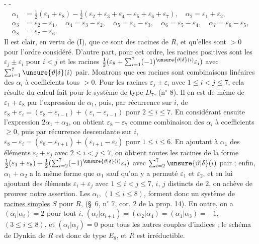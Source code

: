 -  -
\[
\begin{aligned}
\alpha_1&=\tfrac12(\varepsilon_1+\varepsilon_8)-\tfrac12(\varepsilon_2+\varepsilon_3+\varepsilon_4+\varepsilon_5+\varepsilon_6+\varepsilon_7),\quad
\alpha_2=\varepsilon_1+\varepsilon_2,\\
\alpha_3&=\varepsilon_2-\varepsilon_1,\quad
\alpha_4=\varepsilon_3-\varepsilon_2,\quad
\alpha_5=\varepsilon_4-\varepsilon_3,\quad
\alpha_6=\varepsilon_5-\varepsilon_4,\quad
\alpha_7=\varepsilon_6-\varepsilon_5,\\
\alpha_8&=\varepsilon_7-\varepsilon_6.
\end{aligned}
\]
Il est clair, en vertu de (I), que ce sont des racines de $R$, et qu'elles sont $>0$ pour l'ordre considéré. D'autre part, pour cet ordre, les racines positives sont les $\varepsilon_j\pm\varepsilon_i$ pour $i<j$ et les racines $\tfrac12(\varepsilon_8+\sum_{i=1}^7(-1)^{\unsure{\vartheta|\delta}(i)}\varepsilon_i)$ avec $\sum_{i=1}^7\unsure{\vartheta|\delta}(i)$ pair. Montrons que ces racines sont combinaisons linéaires des $\alpha_i$ à coefficients tous $>0$. Pour les racines $\varepsilon_j\pm\varepsilon_i$ avec $1\leq i<j\leq7$, cela résulte du calcul fait pour le système de type $D_7$, (n$^\circ$ 8). Il en est de même de $\varepsilon_1+\varepsilon_8$ par l'expression de $\alpha_1$, puis, par récurrence sur $i$, de $\varepsilon_8+\varepsilon_i=(\varepsilon_8+\varepsilon_{i-1})+(\varepsilon_i-\varepsilon_{i-1})$ pour $2\leq i\leq7$. En considérant ensuite l'expression $2\alpha_1+\alpha_3$, on obtient $\varepsilon_8-\varepsilon_7$ comme combinaison des $\alpha_i$ à coefficients $\geq0$, puis par récurrence descendante sur $i$, $\varepsilon_8-\varepsilon_i=(\varepsilon_8-\varepsilon_{i+1})+(\varepsilon_{i+1}-\varepsilon_i)$ pour $1\leq i\leq6$. En ajoutant à $\alpha_1$ des éléments $\varepsilon_i+\varepsilon_j$ avec $2\leq i<j\leq7$, on obtient toutes les racines de la forme $\tfrac12(\varepsilon_1+\varepsilon_8)+\tfrac12(\sum_{i=2}^7(-1)^{\unsure{\vartheta|\delta}(i)}\varepsilon_i)$ avec $\sum_{i=2}^7\unsure{\vartheta|\delta}(i)$ pair ; enfin, $\alpha_1+\alpha_2$ a la même forme que $\alpha_1$ sauf qu'on y a permuté $\varepsilon_1$ et $\varepsilon_2$, et en lui ajoutant des éléments $\varepsilon_i+\varepsilon_j$ avec $1\leq i<j\leq7$, $i$, $j$ distincts de $2$, on achève de prouver notre assertion. Les $\alpha_i$, $(1\leq i\leq8)$, forment donc un système de \uline{racines simples} $S$ pour $R$, (\S\ 6, n$^\circ$ 7, cor. 2 de la prop. 14). En outre, on a $(\alpha_i|\alpha_i)=2$ pour tout $i$, $(\alpha_i|\alpha_{i+1})=(\alpha_2|\alpha_4)=(\alpha_1|\alpha_3)=-1$, $(3\leq i\leq8)$, et $(\alpha_i|\alpha_j)=0$ pour tous les autres couples d'indices ; le schéma de Dynkin de $R$ est donc de type $E_8$, et $R$ est irréductible.
